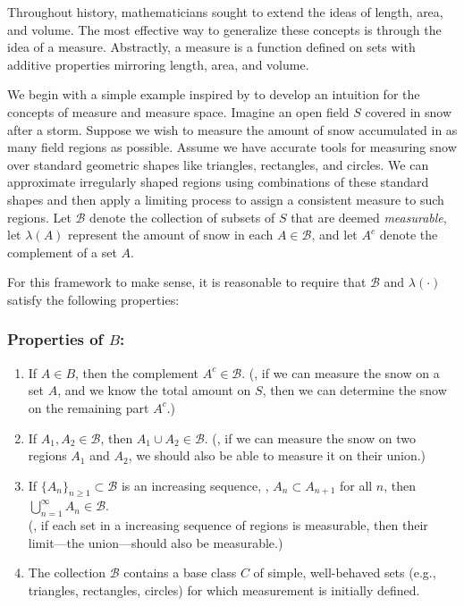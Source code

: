 Throughout history, mathematicians sought to extend the ideas of length, area, and volume. The most effective way to generalize these concepts is through the idea of a measure. Abstractly, a measure is a function defined on sets with additive properties mirroring length, area, and volume.

We begin with a simple example inspired by \cite{athreyaMeasureTheoryProbability2006} to develop an intuition for the concepts of measure and measure space.
Imagine an open field $S$ covered in snow after a storm. Suppose we wish to measure the amount of snow accumulated in as many field regions as possible.
Assume we have accurate tools for measuring snow over standard geometric shapes like triangles, rectangles, and circles. 
We can approximate irregularly shaped regions using combinations of these standard shapes and then apply a limiting process to assign a consistent measure to such regions. 
Let $\mathcal{B}$ denote the collection of subsets of $S$ that are deemed \emph{measurable}, let $\lambda(A)$ represent the amount of snow in each $A \in \mathcal{B}$, and let $A^c$ denote the complement of a set $A$.


For this framework to make sense, it is reasonable to require that $ \mathcal{B}$ and $\lambda (\cdot)$ satisfy the following properties:

\subsubsection*{Properties of $B$:}
\begin{enumerate}
    \item If $A \in B$, then the complement $A^c \in \mathcal{B}$. (\ie, if we can measure the snow on a set $A$, and we know the total amount on $S$, then we can determine the snow on the remaining part $A^c$.)
    \item If $A_1, A_2 \in \mathcal{B}$, then \(A_1 \cup A_2 \in \mathcal{B}\).  
    (\ie, if we can measure the snow on two regions \(A_1\) and \(A_2\), we should also be able to measure it on their union.)
    \item If $\{A_n\}_{n \geq 1} \subset \mathcal{B}$ is an increasing sequence, \ie, $A_n \subset A_{n+1}$ for all $n$, then $\bigcup_{n=1}^{\infty} A_n \in \mathcal{B}$.  
    \\(\ie, if each set in a increasing sequence of regions is measurable, then their limit—the union—should also be measurable.)
    \item The collection $\mathcal{B}$ contains a base class $C$ of simple, well-behaved sets (e.g., triangles, rectangles, circles) for which measurement is initially defined.
\end{enumerate}

